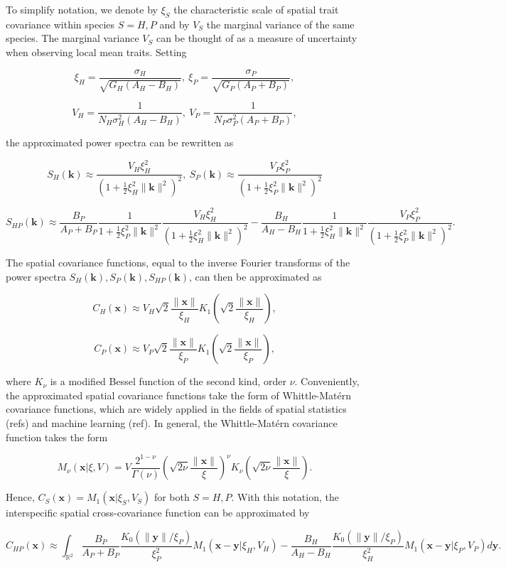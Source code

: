 \documentclass{article}
\begin{document}
To simplify notation, we denote by \(\xi_S\) the characteristic scale of
spatial trait covariance within species \(S=H,P\) and by \(V_S\) the
marginal variance of the same species. The marginal variance \(V_S\) can
be thought of as a measure of uncertainty when observing local mean
traits. Setting

\[\xi_H=\frac{\sigma_H}{\sqrt{G_H(A_H-B_H)}}, \ \xi_P=\frac{\sigma_P}{\sqrt{G_P(A_P+B_P)}},\]

\[V_H=\frac{1}{N_H\sigma_H^2(A_H-B_H)}, \ V_P=\frac{1}{N_P\sigma_P^2(A_P+B_P)},\]

the approximated power spectra can be rewritten as

\[S_H(\pmb k)\approx \frac{V_H\xi_H^2}{(1+\frac{1}{2}\xi_H^2\|\pmb k\|^2)^2}, \ S_P(\pmb k)\approx \frac{V_P\xi_P^2}{(1+\frac{1}{2}\xi_P^2\|\pmb k\|^2)^2}\]

\[S_{HP}(\pmb k)\approx \frac{B_P}{A_P+B_P}\frac{1}{1+\frac{1}{2}\xi_P^2\|\pmb k\|^2}\frac{V_H\xi_H^2}{(1+\frac{1}{2}\xi_H^2\|\pmb k\|^2)^2}-\frac{B_H}{A_H-B_H}\frac{1}{1+\frac{1}{2}\xi_H^2\|\pmb k\|^2}\frac{V_P\xi_P^2}{(1+\frac{1}{2}\xi_P^2\|\pmb k\|^2)^2}.\]

The spatial covariance functions, equal to the inverse Fourier
transforms of the power spectra
\(S_H(\pmb k),S_P(\pmb k),S_{HP}(\pmb k)\), can then be approximated as

\[C_H(\pmb x)\approx V_H\sqrt2\frac{\|\pmb x\|}{\xi_H}K_1\left(\sqrt2\frac{\|\pmb x\|}{\xi_H}\right),\]

\[C_P(\pmb x)\approx V_P\sqrt2\frac{\|\pmb x\|}{\xi_P}K_1\left(\sqrt2\frac{\|\pmb x\|}{\xi_P}\right),\]

where \(K_\nu\) is a modified Bessel function of the second kind, order
\(\nu\). Conveniently, the approximated spatial covariance functions
take the form of Whittle-Matérn covariance functions, which are widely
applied in the fields of spatial statistics (refs) and machine learning
(ref). In general, the Whittle-Matérn covariance function takes the form

\[M_\nu(\pmb x|\xi,V)=V\frac{2^{1-\nu}}{\Gamma(\nu)}\left(\sqrt{2\nu}\frac{\|\pmb x\|}{\xi}\right)^\nu K_\nu\left(\sqrt{2\nu}\frac{\|\pmb x\|}{\xi}\right).\]

Hence, \(C_S(\pmb x)=M_1(\pmb x|\xi_S,V_S)\) for both \(S=H,P\). With
this notation, the interspecific spatial cross-covariance function can
be approximated by

\[C_{HP}(\pmb x)\approx \int_{\mathbb R^2}\frac{B_P}{A_P+B_P}\frac{K_0(\|\pmb y\|/\xi_P)}{\xi_P^2}M_1(\pmb x-\pmb y|\xi_H,V_H)-\frac{B_H}{A_H-B_H}\frac{K_0(\|\pmb y\|/\xi_P)}{\xi_H^2}M_1(\pmb x-\pmb y|\xi_P,V_P)d\pmb y.\]
\end{document}
